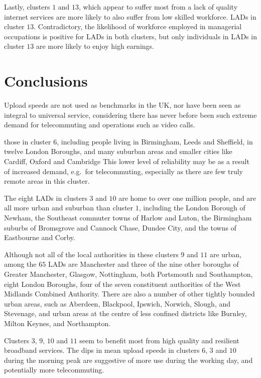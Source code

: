 \documentclass[Royal,times,sageh]{sagej}
\begin{document}
Lastly, clusters \(1\) and \(13\), which appear to suffer most from a
lack of quality internet services are more likely to also suffer from
low skilled workforce. LADs in cluster \(13\). Contradictory, the
likelihood of workforce employed in managerial occupations is positive
for LADs in both clusters, but only individuals in LADs in cluster
\(13\) are more likely to enjoy high earnings.

\hypertarget{sec:5}{%
\section{Conclusions}\label{sec:5}}

Upload speeds are not used as benchmarks in the UK, nor have been seen
as integral to universal service, considering there has never before
been such extreme demand for telecommuting and operations such as video
calls.

those in cluster \(6\), including people living in Birmingham, Leeds and
Sheffield, in twelve London Boroughs, and many suburban areas and
smaller cities like Cardiff, Oxford and Cambridge This lower level of
reliability may be as a result of increased demand, e.g.~for
telecommuting, especially as there are few truly remote areas in this
cluster.

The eight LADs in clusters \(3\) and \(10\) are home to over one million
people, and are all more urban and suburban than cluster \(1\),
including the London Borough of Newham, the Southeast commuter towns of
Harlow and Luton, the Birmingham suburbs of Bromsgrove and Cannock
Chase, Dundee City, and the towns of Eastbourne and Corby.

Although not all of the local authorities in these clusters \(9\) and
\(11\) are urban, among the \(65\) LADs are Manchester and three of the
nine other boroughs of Greater Manchester, Glasgow, Nottingham, both
Portsmouth and Southampton, eight London Boroughs, four of the seven
constituent authorities of the West Midlands Combined Authority. There
are also a number of other tightly bounded urban areas, such as
Aberdeen, Blackpool, Ipswich, Norwich, Slough, and Stevenage, and urban
areas at the centre of less confined districts like Burnley, Milton
Keynes, and Northampton.

Clusters \(3\), \(9\), \(10\) and \(11\) seem to benefit most from high
quality and resilient broadband services. The dips in mean upload speeds
in clusters \(6\), \(3\) and \(10\) during the morning peak are
suggestive of more use during the working day, and potentially more
telecommuting.
\end{document}
